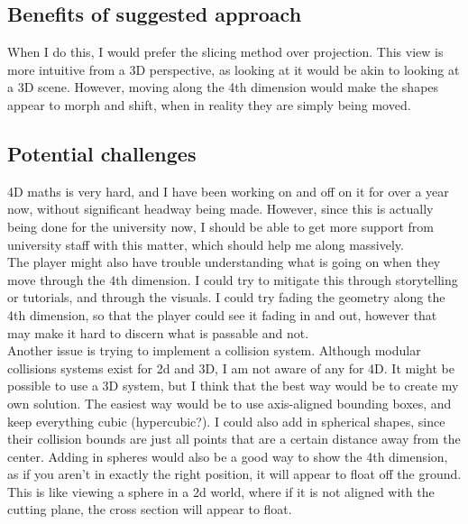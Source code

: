\documentclass[12pt]{article}
\begin{document}
\subsection{Benefits of suggested approach}
When I do this, I would prefer the slicing method over projection. 
This view is more intuitive from a 3D perspective, as looking at it would be akin to looking at a 3D scene. 
However, moving along the 4th dimension would make the shapes appear to morph and shift, when in reality they are simply being moved.

\subsection{Potential challenges}
4D maths is very hard, and I have been working on and off on it for over a year now, without significant headway being made. 
However, since this is actually being done for the university now, I should be able to get more support from university staff with this matter, which should help me along massively.\\
The player might also have trouble understanding what is going on when they move through the 4th dimension. I could try to mitigate this through storytelling or tutorials, and through the visuals.
I could try fading the geometry along the 4th dimension, so that the player could see it fading in and out, however that may make it hard to discern what is passable and not.\\
Another issue is trying to implement a collision system. Although modular collisions systems exist for 2d and 3D, I am not aware of any for 4D. It might be possible to use a 3D system, but I think that the best way would be to create my own solution.
The easiest way would be to use axis-aligned bounding boxes, and keep everything cubic (hypercubic?).
I could also add in spherical shapes, since their collision bounds are just all points that are a certain distance away from the center.
Adding in spheres would also be a good way to show the 4th dimension, as if you aren't in exactly the right position, it will appear to float off the ground.
This is like viewing a sphere in a 2d world, where if it is not aligned with the cutting plane, the cross section will appear to float.
\end{document}

